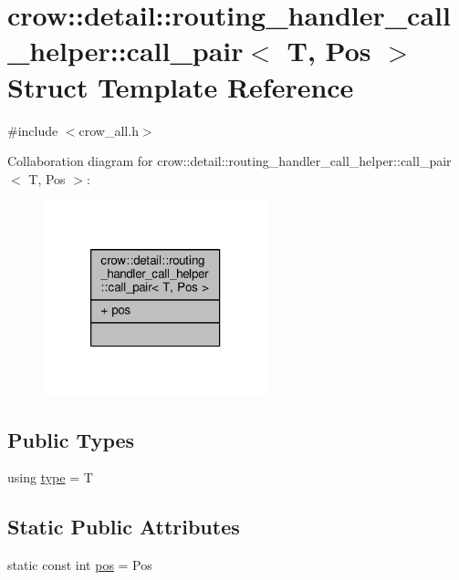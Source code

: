 \hypertarget{structcrow_1_1detail_1_1routing__handler__call__helper_1_1call__pair}{\section{crow\-:\-:detail\-:\-:routing\-\_\-handler\-\_\-call\-\_\-helper\-:\-:call\-\_\-pair$<$ T, Pos $>$ Struct Template Reference}
\label{structcrow_1_1detail_1_1routing__handler__call__helper_1_1call__pair}
}


{\ttfamily \#include $<$crow\-\_\-all.\-h$>$}



Collaboration diagram for crow\-:\-:detail\-:\-:routing\-\_\-handler\-\_\-call\-\_\-helper\-:\-:call\-\_\-pair$<$ T, Pos $>$\-:
\nopagebreak
\begin{figure}[H]
\begin{center}
\leavevmode
\includegraphics[width=184pt]{structcrow_1_1detail_1_1routing__handler__call__helper_1_1call__pair__coll__graph}
\end{center}
\end{figure}
\subsection*{Public Types}
\begin{DoxyCompactItemize}
\item 
using \hyperlink{structcrow_1_1detail_1_1routing__handler__call__helper_1_1call__pair_ac9c6c2efb5d7d0360e8950a314b336c5}{type} = T
\end{DoxyCompactItemize}
\subsection*{Static Public Attributes}
\begin{DoxyCompactItemize}
\item 
static const int \hyperlink{structcrow_1_1detail_1_1routing__handler__call__helper_1_1call__pair_a3308154ca21ab288c0dca19c2bd545af}{pos} = Pos
\end{DoxyCompactItemize}


